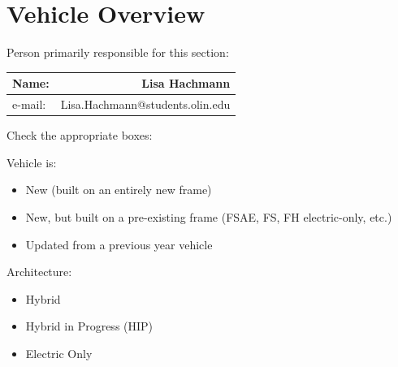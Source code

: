 \documentclass{article}
\begin{document}

\newpage

\section{Vehicle Overview}
    Person primarily responsible for this section:

    \begin{table}[H]
        \centering
        \label{responsible1}
        \begin{tabular}{lr}
        Name: & Lisa Hachmann \\ \hline
        e-mail: & Lisa.Hachmann@students.olin.edu \\ \hline
        \end{tabular}
    \end{table}

    Check the appropriate boxes:\\

    \par{Vehicle is:}
    \begin{itemize}
        \item \makebox[0pt][l]{$\square$}\raisebox{.15ex}{\hspace{0.1em}$\checkmark$} \hspace{0.2cm} New (built on an entirely new frame)
        \item \makebox[0pt][l]{$\square$}\raisebox{.15ex}{\hspace{0.1em}} \hspace{0.2cm} New, but built on a pre-existing frame (FSAE, FS, FH electric-only, etc.)
        \item \makebox[0pt][l]{$\square$}\raisebox{.15ex}{\hspace{0.1em}} \hspace{0.2cm} Updated from a previous year vehicle
    \end{itemize}

    \par{Architecture:}
    \begin{itemize}
        \item \makebox[0pt][l]{$\square$}\raisebox{.15ex}{\hspace{0.1em}} \hspace{0.2cm} Hybrid
        \item \makebox[0pt][l]{$\square$}\raisebox{.15ex}{\hspace{0.1em}} \hspace{0.2cm} Hybrid in Progress (HIP)
        \item \makebox[0pt][l]{$\square$}\raisebox{.15ex}{\hspace{0.1em}$\checkmark$} \hspace{0.2cm} Electric Only
    \end{itemize}
\end{document}
